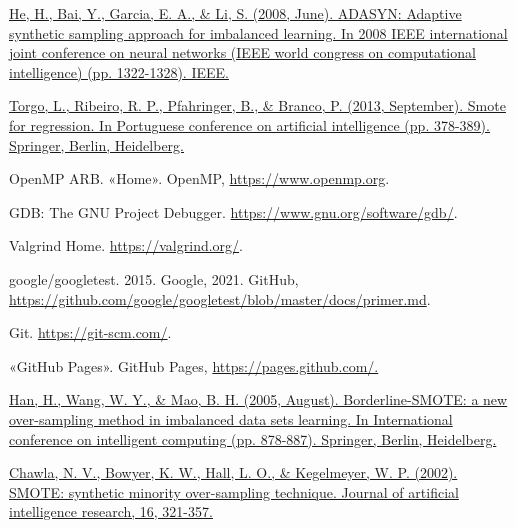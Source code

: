 \begin{thebibliography}{9}

	\href{https://ieeexplore.ieee.org/abstract/document/4633969}{He, H., Bai, Y., Garcia, E. A., \& Li, S. (2008, June). ADASYN: Adaptive synthetic sampling approach for imbalanced learning. In 2008 IEEE international joint conference on neural networks (IEEE world congress on computational intelligence) (pp. 1322-1328). IEEE.}



	\href{https://link.springer.com/chapter/10.1007/978-3-642-40669-0_33}{Torgo, L., Ribeiro, R. P., Pfahringer, B., \& Branco, P. (2013, September). Smote for regression. In Portuguese conference on artificial intelligence (pp. 378-389). Springer, Berlin, Heidelberg. }





	OpenMP ARB. «Home». OpenMP, \url{https://www.openmp.org}.


	GDB: The GNU Project Debugger. \url{https://www.gnu.org/software/gdb/}.


	Valgrind Home. \url{https://valgrind.org/}.


	google/googletest. 2015. Google, 2021. GitHub, \url{https://github.com/google/googletest/blob/master/docs/primer.md}.


	Git. \url{https://git-scm.com/}.


	«GitHub Pages». GitHub Pages, \url{https://pages.github.com/.}


	\href{https://link.springer.com/chapter/10.1007/11538059_91}{Han, H., Wang, W. Y., \& Mao, B. H. (2005, August). Borderline-SMOTE: a new over-sampling method in imbalanced data sets learning. In International conference on intelligent computing (pp. 878-887). Springer, Berlin, Heidelberg.}


	\href{https://www.jair.org/index.php/jair/article/view/10302}{Chawla, N. V., Bowyer, K. W., Hall, L. O., \& Kegelmeyer, W. P. (2002). SMOTE: synthetic minority over-sampling technique. Journal of artificial intelligence research, 16, 321-357.}



\end{thebibliography}
